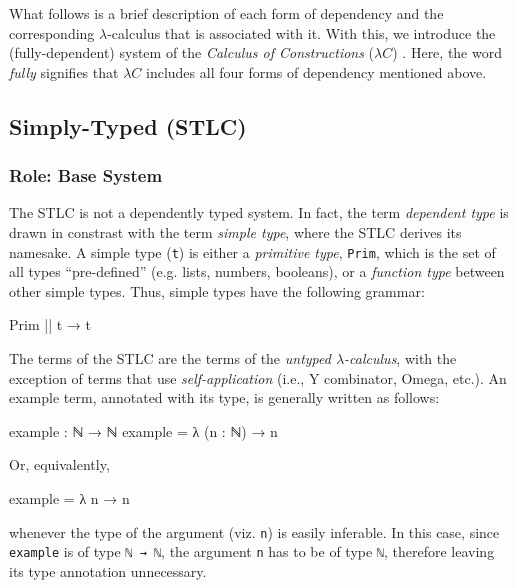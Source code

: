 \documentclass[12pt]{article}
\begin{document}
What follows is a brief description of each form of dependency and the
corresponding \(\lambda\)-calculus that is associated with it. With this, we
introduce the (fully-dependent) system of the \textit{Calculus of Constructions}
(\(\lambda C\)) \cite{}. Here, the word \textit{fully} signifies that \(\lambda C\)
includes all four forms of dependency mentioned above.

\subsection*{Simply-Typed (STLC)}
\subsubsection*{Role: Base System}
The STLC is not a dependently typed system. In fact, the term {\em dependent type}
is drawn in constrast with the term {\em simple type}, where the STLC derives
its namesake. A simple type ({\tt t}) is either a {\em primitive type}, {\tt Prim},
which is the set of all types ``pre-defined'' (e.g. lists, numbers, booleans),
or a {\em function type} between other simple types. Thus, simple types have the
following grammar:
\begin{center}
\begin{minipage}{0.5\textwidth}
\begin{code}
Prim || t → t
\end{code}
\end{minipage}
\end{center}
The terms of the STLC are the terms of the \textit{untyped \(\lambda\)-calculus},
with the exception of terms that use \textit{self-application} (i.e., Y
combinator, Omega, etc.). An example term, annotated with its type, is generally
written as follows:
\begin{center}
\begin{minipage}{0.5\textwidth}
\begin{code}
example : ℕ → ℕ
example = λ (n : ℕ) → n
\end{code}
\end{minipage}
\end{center}
Or, equivalently,
\begin{center}
\begin{minipage}{0.5\textwidth}
\begin{code}
example = λ n → n
\end{code}
\end{minipage}
\end{center}
whenever the type of the argument (viz. {\tt n}) is easily inferable. In this
case, since {\tt example} is of type {\tt ℕ → ℕ}, the argument {\tt n} has
to be of type {\tt ℕ}, therefore leaving its type annotation unnecessary.
\end{document}
